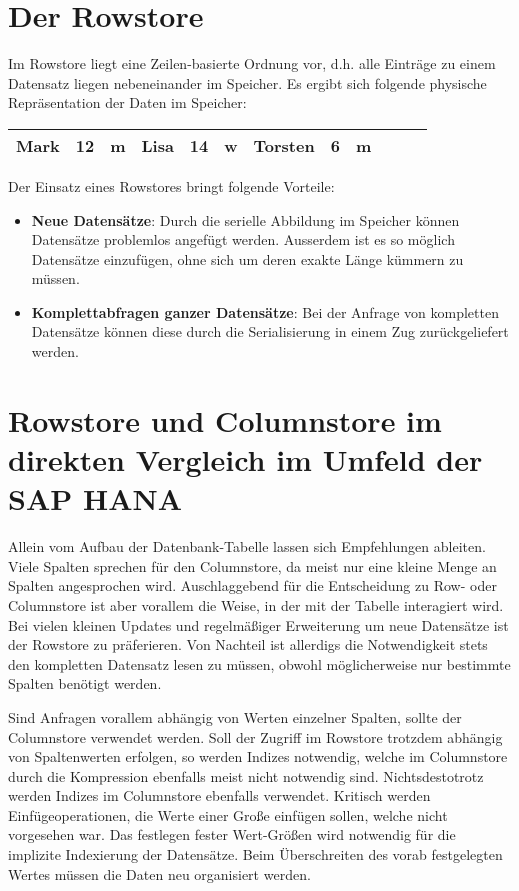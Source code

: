\section{Der Rowstore}\label{row_col:rowstore}
Im Rowstore liegt eine Zeilen-basierte Ordnung vor, d.h. alle Einträge zu einem Datensatz liegen nebeneinander im Speicher. Es ergibt sich folgende physische Repräsentation der Daten im Speicher:

\begin{center}
    \begin{tabular}{ | l | l | l | l | l | l | l | l | l | l | l | l |}
    \hline
    Mark & 12 & m & Lisa & 14 & w & Torsten & 6 & m \\ \hline
    \end{tabular}
\end{center}

Der Einsatz eines Rowstores bringt folgende Vorteile: 

\begin{itemize}
    \item \textbf{Neue Datensätze}: Durch die serielle Abbildung im Speicher können Datensätze problemlos angefügt werden. Ausserdem ist es so möglich Datensätze einzufügen, ohne sich um deren exakte Länge kümmern zu müssen.
    \item \textbf{Komplettabfragen ganzer Datensätze}: Bei der Anfrage von kompletten Datensätze können diese durch die Serialisierung in einem Zug zurückgeliefert werden. 
\end{itemize}

\section{Rowstore und Columnstore im direkten Vergleich im Umfeld der SAP HANA}

Allein vom Aufbau der Datenbank-Tabelle lassen sich Empfehlungen ableiten. Viele Spalten sprechen für den Columnstore, da meist nur eine kleine Menge an Spalten angesprochen wird. 
Auschlaggebend für die Entscheidung zu Row- oder Columnstore ist aber vorallem die Weise, in der mit der Tabelle interagiert wird. Bei vielen kleinen Updates und regelmäßiger Erweiterung um neue Datensätze ist der Rowstore zu präferieren. Von Nachteil ist allerdigs die Notwendigkeit stets den kompletten Datensatz lesen zu müssen, obwohl möglicherweise nur bestimmte Spalten benötigt werden. 

Sind Anfragen vorallem abhängig von Werten einzelner Spalten, sollte der Columnstore verwendet werden. Soll der Zugriff im Rowstore trotzdem abhängig von Spaltenwerten erfolgen, so werden Indizes notwendig, welche im Columnstore durch die Kompression ebenfalls meist nicht notwendig sind. Nichtsdestotrotz werden Indizes im Columnstore ebenfalls verwendet. Kritisch werden Einfügeoperationen, die Werte einer Große einfügen sollen, welche nicht vorgesehen war. Das festlegen fester Wert-Größen wird notwendig für die implizite Indexierung der Datensätze. Beim Überschreiten des vorab festgelegten Wertes müssen die Daten neu organisiert werden. 

